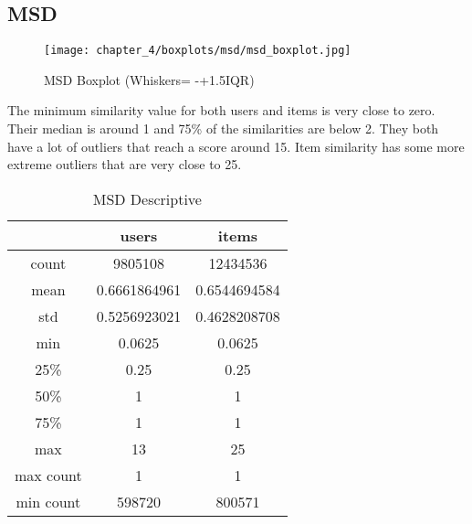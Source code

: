 \subsection{MSD}
\begin{figure}[H]
\centering
\texttt{[image: chapter\_4/boxplots/msd/msd\_boxplot.jpg]}
\caption{MSD Boxplot (Whiskers= -+1.5IQR)}
\label{figure:msd_boxplot}
\end{figure}

The minimum similarity value for both users and items is very close to zero. Their median
is around 1 and 75\% of the similarities are below 2. They both have a lot of outliers that
reach a score around 15. Item similarity has some more extreme outliers that are very close to 25.

\begin{table}[H]
\centering
\caption{MSD Descriptive}
\label{table:msd_descriptive}
\begin{tabular}{|c|c|c|}
\hline
          & \textbf{users} & \textbf{items} \\ \hline
count     & 9805108        & 12434536       \\ \hline
mean      & 0.6661864961   & 0.6544694584   \\ \hline
std       & 0.5256923021   & 0.4628208708   \\ \hline
min       & 0.0625         & 0.0625         \\ \hline
25\%      & 0.25           & 0.25           \\ \hline
50\%      & 1              & 1              \\ \hline
75\%      & 1              & 1              \\ \hline
max       & 13             & 25             \\ \hline
max count & 1              & 1              \\ \hline
min count & 598720         & 800571         \\ \hline
\end{tabular}
\end{table}

